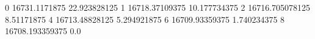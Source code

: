 0 16731.1171875 22.923828125
1 16718.37109375 10.177734375
2 16716.705078125 8.51171875
4 16713.48828125 5.294921875
6 16709.93359375 1.740234375
8 16708.193359375 0.0
